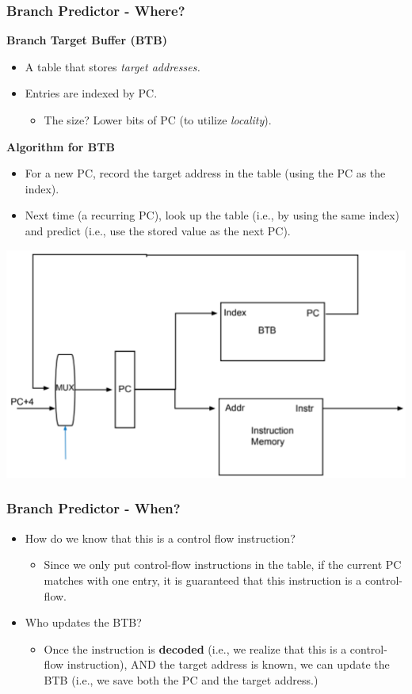 \documentclass[10pt]{article}
\begin{document}
\subsubsection*{Branch Predictor - Where?}
\textbf{Branch Target Buffer (BTB)}
\begin{itemize}
    \item A table that stores \textit{target addresses.}
    \item Entries are indexed by PC.
    \begin{itemize}
        \item The size?  Lower bits of PC (to utilize \textit{locality}).
    \end{itemize}
\end{itemize}
\textbf{Algorithm for BTB}
\begin{itemize}
    \item For a new PC, record the target address in the table (using the PC as the index).
    \item Next time (a recurring PC), look up the table (i.e., by using the same index) and predict (i.e., use the stored value as the next PC).
\end{itemize}
\begin{center}
    \includegraphics*[scale=0.7]{W4_2.png}
\end{center}

\subsubsection*{Branch Predictor - When?}
\begin{itemize}
    \item How do we know that this is a control flow instruction?
    \begin{itemize}
        \item Since we only put control-flow instructions in the table, if the current PC matches with one entry, it is guaranteed that this instruction is a control-flow.
    \end{itemize}
    \item Who updates the BTB?
    \begin{itemize}
        \item Once the instruction is \textbf{decoded} (i.e., we realize that this is a control-flow instruction), AND the target address is known, we can update the BTB (i.e., we save both the PC and the target address.)
    \end{itemize}
\end{itemize}
\end{document}

